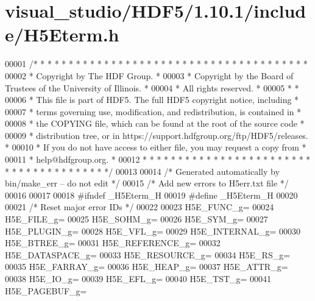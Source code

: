 \hypertarget{visual__studio_2_h_d_f5_21_810_81_2include_2_h5_eterm_8h_source}{}\section{visual\+\_\+studio/\+H\+D\+F5/1.10.1/include/\+H5\+Eterm.h}
\label{visual__studio_2_h_d_f5_21_810_81_2include_2_h5_eterm_8h_source}

\begin{DoxyCode}
00001 \textcolor{comment}{/* * * * * * * * * * * * * * * * * * * * * * * * * * * * * * * * * * * * * * *}
00002 \textcolor{comment}{ * Copyright by The HDF Group.                                               *}
00003 \textcolor{comment}{ * Copyright by the Board of Trustees of the University of Illinois.         *}
00004 \textcolor{comment}{ * All rights reserved.                                                      *}
00005 \textcolor{comment}{ *                                                                           *}
00006 \textcolor{comment}{ * This file is part of HDF5.  The full HDF5 copyright notice, including     *}
00007 \textcolor{comment}{ * terms governing use, modification, and redistribution, is contained in    *}
00008 \textcolor{comment}{ * the COPYING file, which can be found at the root of the source code       *}
00009 \textcolor{comment}{ * distribution tree, or in https://support.hdfgroup.org/ftp/HDF5/releases.  *}
00010 \textcolor{comment}{ * If you do not have access to either file, you may request a copy from     *}
00011 \textcolor{comment}{ * help@hdfgroup.org.                                                        *}
00012 \textcolor{comment}{ * * * * * * * * * * * * * * * * * * * * * * * * * * * * * * * * * * * * * * */}
00013 
00014 \textcolor{comment}{/* Generated automatically by bin/make\_err -- do not edit */}
00015 \textcolor{comment}{/* Add new errors to H5err.txt file */}
00016 
00017 
00018 \textcolor{preprocessor}{#ifndef \_H5Eterm\_H}
00019 \textcolor{preprocessor}{#define \_H5Eterm\_H}
00020 
00021 \textcolor{comment}{/* Reset major error IDs */}
00022     
00023 H5E\_FUNC\_g=    
00024 H5E\_FILE\_g=    
00025 H5E\_SOHM\_g=    
00026 H5E\_SYM\_g=    
00027 H5E\_PLUGIN\_g=    
00028 H5E\_VFL\_g=    
00029 H5E\_INTERNAL\_g=    
00030 H5E\_BTREE\_g=    
00031 H5E\_REFERENCE\_g=    
00032 H5E\_DATASPACE\_g=    
00033 H5E\_RESOURCE\_g=    
00034 H5E\_RS\_g=    
00035 H5E\_FARRAY\_g=    
00036 H5E\_HEAP\_g=    
00037 H5E\_ATTR\_g=    
00038 H5E\_IO\_g=    
00039 H5E\_EFL\_g=    
00040 H5E\_TST\_g=    
00041 H5E\_PAGEBUF\_g=    

\end{DoxyCode}
